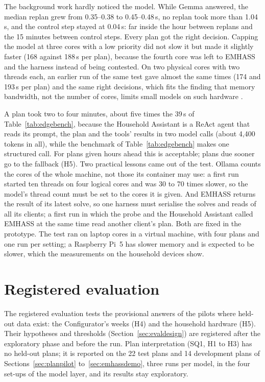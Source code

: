 The background work hardly noticed the model. While Gemma answered, the
median replan grew from 0.35--0.38 to 0.45--0.48\,s, no replan took
more than 1.04\,s, and the control step stayed at 0.04\,s: far inside
the hour between replans and the 15 minutes between control steps.
Every plan got the right decision. Capping the model at three cores
with a low priority did not slow it but made it slightly faster (168
against 188\,s per plan), because the fourth core was left to EMHASS
and the harness instead of being contested. On two physical cores with
two threads each, an earlier run of the same test gave almost the same
times (174 and 193\,s per plan) and the same right decisions, which fits
the finding that memory bandwidth, not the number of cores, limits small
models on such hardware \parencite{islam2025}.

A plan took two to four minutes, about five times the 39\,s of
Table~\ref{tab:edgebench}, because the Household Assistant is a ReAct
agent that reads its prompt, the plan and the tools' results in two
model calls (about 4,400 tokens in all), while the benchmark of
Table~\ref{tab:edgebench} makes one structured call. For plans given
hours ahead this is acceptable; plans due sooner go to the fallback
(H5). Two practical lessons came out of the test. Ollama counts the
cores of the whole machine, not those its container may use: a first
run started ten threads on four logical cores and was 30 to 70 times
slower, so the model's thread count must be set to the cores it is
given. And EMHASS returns the result of its latest solve, so one
harness must serialise the solves and reads of all its clients; a first
run in which the probe and the Household Assistant called EMHASS at the
same time read another client's plan. Both are fixed in the prototype.
The test ran on laptop cores in a virtual machine, with four plans and
one run per setting; a Raspberry Pi~5 has slower memory and is
expected to be slower, which the measurements on the household devices
show.

\section{Registered evaluation}
\label{sec:registered}

The registered evaluation tests the provisional answers of the pilots
where held-out data exist: the Configurator's weeks (H4) and the
household hardware (H5). Their hypotheses and thresholds
(Section~\ref{sec:evaldesign}) are registered after the exploratory
phase and before the run. Plan interpretation (SQ1, H1 to H3) has no
held-out plans; it is reported on the 22 test plans and 14 development
plans of Sections~\ref{sec:planpilot} to~\ref{sec:emhassdemo}, three
runs per model, in the four set-ups of the model layer, and its results
stay exploratory.

